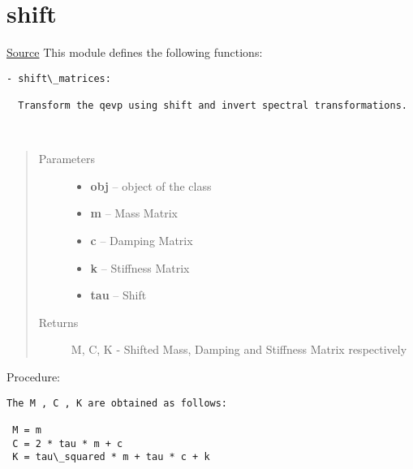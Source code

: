 \documentclass[letterpaper,10pt,english]{sphinxmanual}
\begin{document}
\section{shift}
\label{index:shift}
\href{https://bitbucket.org/akadar/brakesqueal0.1/src/master/brake/initialize/shift.py?at=master}{Source}
\label{index:module-brake.initialize.shift}
This module defines the following functions:

\begin{Verbatim}[commandchars=\\\{\}]
- shift\_matrices:

  Transform the qevp using shift and invert spectral transformations.
\end{Verbatim}

\begin{fulllineitems}
\label{index:brake.initialize.shift.shift_matrices}~\begin{quote}\begin{description}
\item[{Parameters}] \leavevmode\begin{itemize}
\item {} 
\textbf{obj} -- object of the class 

\item {} 
\textbf{m} -- Mass Matrix

\item {} 
\textbf{c} -- Damping Matrix

\item {} 
\textbf{k} -- Stiffness Matrix

\item {} 
\textbf{tau} -- Shift

\end{itemize}

\item[{Returns}] \leavevmode
M, C, K - Shifted Mass, Damping and Stiffness Matrix respectively

\end{description}\end{quote}

Procedure:

\begin{Verbatim}[commandchars=\\\{\}]
The M , C , K are obtained as follows:

 M = m
 C = 2 * tau * m + c
 K = tau\_squared * m + tau * c + k
\end{Verbatim}

\end{fulllineitems}
\end{document}
